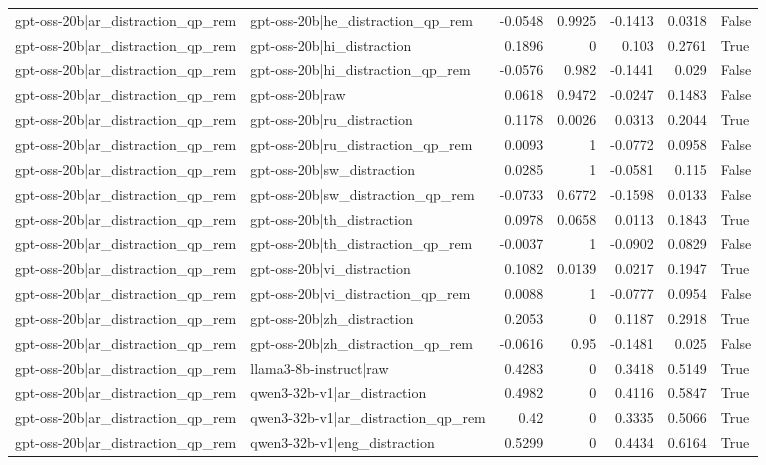 \begin{table}
\begin{tabular}{l l r r r r l}
gpt-oss-20b|ar_distraction_qp_rem & gpt-oss-20b|he_distraction_qp_rem & -0.0548 & 0.9925 & -0.1413 & 0.0318 & False \\
gpt-oss-20b|ar_distraction_qp_rem & gpt-oss-20b|hi_distraction & 0.1896 & 0 & 0.103 & 0.2761 & True \\
gpt-oss-20b|ar_distraction_qp_rem & gpt-oss-20b|hi_distraction_qp_rem & -0.0576 & 0.982 & -0.1441 & 0.029 & False \\
gpt-oss-20b|ar_distraction_qp_rem & gpt-oss-20b|raw & 0.0618 & 0.9472 & -0.0247 & 0.1483 & False \\
gpt-oss-20b|ar_distraction_qp_rem & gpt-oss-20b|ru_distraction & 0.1178 & 0.0026 & 0.0313 & 0.2044 & True \\
gpt-oss-20b|ar_distraction_qp_rem & gpt-oss-20b|ru_distraction_qp_rem & 0.0093 & 1 & -0.0772 & 0.0958 & False \\
gpt-oss-20b|ar_distraction_qp_rem & gpt-oss-20b|sw_distraction & 0.0285 & 1 & -0.0581 & 0.115 & False \\
gpt-oss-20b|ar_distraction_qp_rem & gpt-oss-20b|sw_distraction_qp_rem & -0.0733 & 0.6772 & -0.1598 & 0.0133 & False \\
gpt-oss-20b|ar_distraction_qp_rem & gpt-oss-20b|th_distraction & 0.0978 & 0.0658 & 0.0113 & 0.1843 & True \\
gpt-oss-20b|ar_distraction_qp_rem & gpt-oss-20b|th_distraction_qp_rem & -0.0037 & 1 & -0.0902 & 0.0829 & False \\
gpt-oss-20b|ar_distraction_qp_rem & gpt-oss-20b|vi_distraction & 0.1082 & 0.0139 & 0.0217 & 0.1947 & True \\
gpt-oss-20b|ar_distraction_qp_rem & gpt-oss-20b|vi_distraction_qp_rem & 0.0088 & 1 & -0.0777 & 0.0954 & False \\
gpt-oss-20b|ar_distraction_qp_rem & gpt-oss-20b|zh_distraction & 0.2053 & 0 & 0.1187 & 0.2918 & True \\
gpt-oss-20b|ar_distraction_qp_rem & gpt-oss-20b|zh_distraction_qp_rem & -0.0616 & 0.95 & -0.1481 & 0.025 & False \\
gpt-oss-20b|ar_distraction_qp_rem & llama3-8b-instruct|raw & 0.4283 & 0 & 0.3418 & 0.5149 & True \\
gpt-oss-20b|ar_distraction_qp_rem & qwen3-32b-v1|ar_distraction & 0.4982 & 0 & 0.4116 & 0.5847 & True \\
gpt-oss-20b|ar_distraction_qp_rem & qwen3-32b-v1|ar_distraction_qp_rem & 0.42 & 0 & 0.3335 & 0.5066 & True \\
gpt-oss-20b|ar_distraction_qp_rem & qwen3-32b-v1|eng_distraction & 0.5299 & 0 & 0.4434 & 0.6164 & True \\

\end{tabular}
\end{table}
